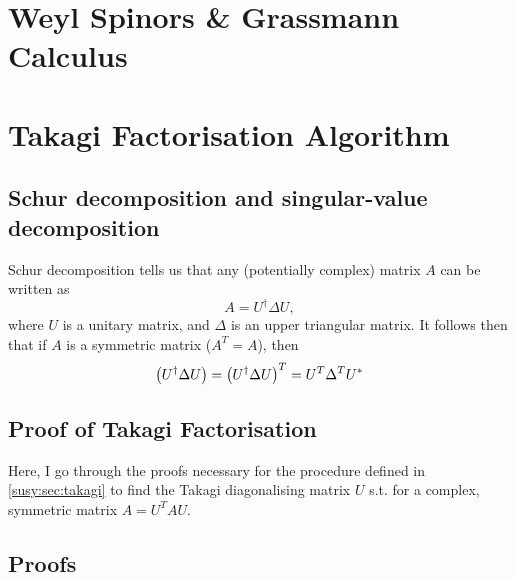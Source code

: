 \documentclass[../main.tex]{subfiles}
\begin{document}
\chapter{Weyl Spinors \& Grassmann Calculus}
\label{app:chap:weyl_grassmann}


\chapter{Takagi Factorisation Algorithm}
\label{app:chap:takagi}
\section{Schur decomposition and singular-value decomposition}
Schur decomposition tells us that any (potentially complex) matrix \(A\) can be written as
\[
  A = U^\dagger \Delta U,
\]
where \(U\) is a unitary matrix, and \(\Delta\) is an upper triangular matrix.
It follows then that if \(A\) is a symmetric matrix (\(A^T = A\)), then
\[
  \left(U^\dagger \Delta U\right) = \left(U^\dagger \Delta U\right)^T = U^T \Delta^T U^\ast
\]

\section{Proof of Takagi Factorisation}
Here, I go through the proofs necessary for the procedure defined in \cref{susy:sec:takagi} to find the Takagi diagonalising matrix \(U\) s.t. for a complex, symmetric matrix \(A = U^T A U\).

\section{Proofs}
\end{document}
